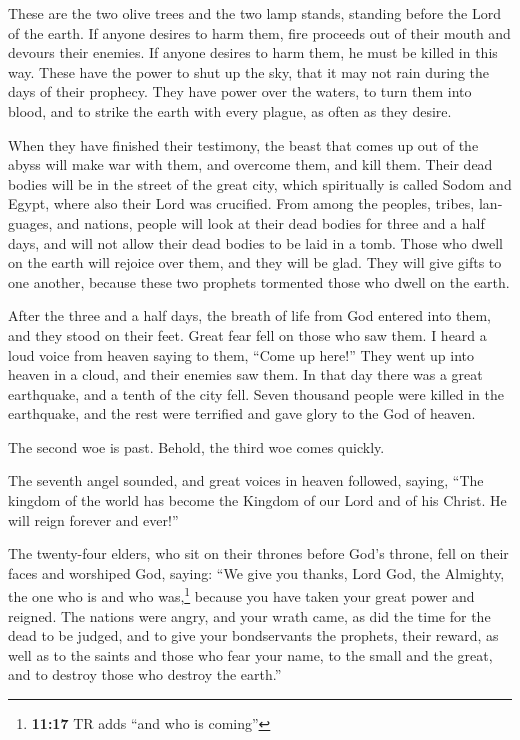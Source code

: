 \begin{paracol}{2}
\begin{otherlanguage}{english}
 These are the two olive trees and the two lamp stands,
standing before the Lord of the earth.  If anyone desires
to harm them, fire proceeds out of their mouth and devours their
enemies. If anyone desires to harm them, he must be killed in this way.
 These have the power to shut up the sky, that it may not
rain during the days of their prophecy. They have power over the waters,
to turn them into blood, and to strike the earth with every plague, as
often as they desire.

 When they have finished their testimony, the beast that
comes up out of the abyss will make war with them, and overcome them,
and kill them.  Their dead bodies will be in the street of
the great city, which spiritually is called Sodom and Egypt, where also
their Lord was crucified.  From among the peoples, tribes,
languages, and nations, people will look at their dead bodies for three
and a half days, and will not allow their dead bodies to be laid in a
tomb.  Those who dwell on the earth will rejoice over
them, and they will be glad. They will give gifts to one another,
because these two prophets tormented those who dwell on the earth.

 After the three and a half days, the breath of life from
God entered into them, and they stood on their feet. Great fear fell on
those who saw them.  I heard a loud voice from heaven
saying to them, ``Come up here!'' They went up into heaven in a cloud,
and their enemies saw them.  In that day there was a
great earthquake, and a tenth of the city fell. Seven thousand people
were killed in the earthquake, and the rest were terrified and gave
glory to the God of heaven.

 The second woe is past. Behold, the third woe comes
quickly.

 The seventh angel sounded, and great voices in heaven
followed, saying, ``The kingdom of the world has become the Kingdom of
our Lord and of his Christ. He will reign forever and ever!''

 The twenty-four elders, who sit on their thrones before
God's throne, fell on their faces and worshiped God, 
saying: ``We give you thanks, Lord God, the Almighty, the one who is and
who was,\footnote{\textbf{11:17} TR adds ``and who is coming''} because
you have taken your great power and reigned.  The nations
were angry, and your wrath came, as did the time for the dead to be
judged, and to give your bondservants the prophets, their reward, as
well as to the saints and those who fear your name, to the small and the
great, and to destroy those who destroy the earth.''


\end{otherlanguage}
\end{paracol}
